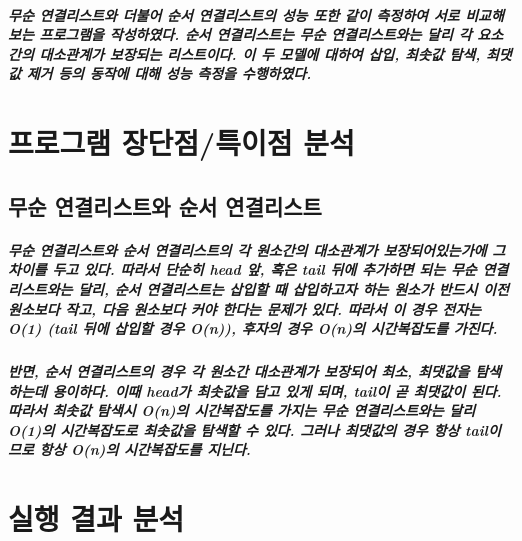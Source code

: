 \documentclass[UTF8, a4paper]{report}
\begin{document}
            \paragraph{%
                \normalfont 무순 연결리스트와 더불어 순서 연결리스트의 성능 또한 같이 측정하여 서로 비교해보는 프로그램을 작성하였다. 순서 연결리스트는 무순 연결리스트와는 달리 각 요소간의 대소관계가 보장되는 리스트이다. 이 두 모델에 대하여 삽입, 최솟값 탐색, 최댓값 제거 등의 동작에 대해 성능 측정을 수행하였다.
            }

    \chapter{프로그램 장단점/특이점 분석}
            \section{무순 연결리스트와 순서 연결리스트}
            \paragraph{%
                \normalfont 무순 연결리스트와 순서 연결리스트의 각 원소간의 대소관계가 보장되어있는가에 그 차이를 두고 있다. 따라서 단순히 head 앞, 혹은 tail 뒤에 추가하면 되는 무순 연결리스트와는 달리, 순서 연결리스트는 삽입할 때 삽입하고자 하는 원소가 반드시 이전 원소보다 작고, 다음 원소보다 커야 한다는 문제가 있다. 따라서 이 경우 전자는 O(1) (tail 뒤에 삽입할 경우 O(n)), 후자의 경우 O(n)의 시간복잡도를 가진다.
            }   

            \paragraph{%
                \normalfont 반면, 순서 연결리스트의 경우 각 원소간 대소관계가 보장되어 최소, 최댓값을 탐색하는데 용이하다. 이때 head가 최솟값을 담고 있게 되며, tail이 곧 최댓값이 된다. 따라서 최솟값 탐색시 O(n)의 시간복잡도를 가지는 무순 연결리스트와는 달리 O(1)의 시간복잡도로 최솟값을 탐색할 수 있다. 그러나 최댓값의 경우 항상 tail이므로 항상 O(n)의 시간복잡도를 지닌다.
            } 

    \chapter{실행 결과 분석}
\end{document}
